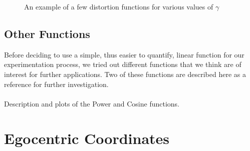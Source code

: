 \begin{figure}[h]
    \caption{\label{fig:plotsOfGamma} An example of a few distortion functions for various values of $\gamma $}
\end{figure}

\subsection*{Other Functions}

Before deciding to use a simple, thus easier to quantify, linear function for our experimentation process, we tried out different functions that we think are of interest for further applications. Two of these functions are described here as a reference for further investigation.
\\\\
Description and plots of the Power and Cosine functions.

\section{Egocentric Coordinates}

